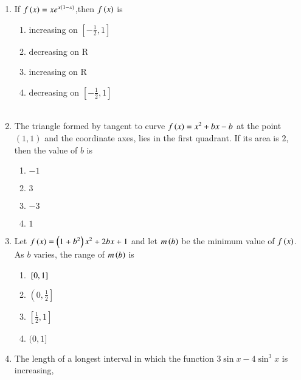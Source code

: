 \documentclass[journal]{IEEEtran}
\begin{document}
\begin{enumerate}[start=9]
\begin{enumerate}
\end{enumerate}
\item If $f\left(x\right)=xe^{x(1-x)}$,then $f\left(x\right)$ is 
\hfill {}
\begin{enumerate}
    \item increasing on $\left[-\displaystyle\frac{1}{2},1\right]$\\
    \item decreasing on R
    \item increasing on R
    \item decreasing on $\left[-\displaystyle\frac{1}{2},1\right]$\\\\
\end{enumerate}

\item The triangle formed by tangent to curve $f\left(x\right)=x^2+bx-b$ at the point $(1,1)$ and the coordinate axes, lies in the first quadrant. If its area is $2$, then the value of $b$ is 
\hfill {}
\begin{multicols}{4}
\begin{enumerate}
    \item $-1$
    \item $3$
    \item $-3$
    \item $1$\\
\end{enumerate}
\end{multicols}
\item Let $f\left(x\right)=\left(1+b^2\right)x^2+2bx+1$ and let $m\left(b\right)$ be the minimum value of $f\left(x\right)$. As $b$ varies, the range of $m\left(b\right)$ is 
\hfill {}
\begin{multicols}{4}
\begin{enumerate}
    \item ${}\left[0,1\right]$\\
    \item $\left(0,\displaystyle\frac{1}{2}\right]$\\
    \item $\left[\displaystyle\frac{1}{2},1\right]$\\
    \item $(0,1]$\\
\end{enumerate}
\end{multicols}
\item The length of a longest interval in which the function $3 \sin x-4\sin^3x$ is increasing,\\

\end{enumerate}
\end{document}
